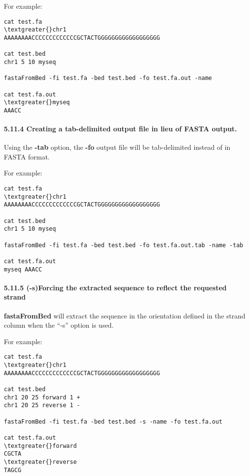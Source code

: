 \documentclass[letterpaper,10pt,english]{sphinxmanual}
\begin{document}
For example:

\begin{Verbatim}[commandchars=\\\{\}]
cat test.fa
\textgreater{}chr1
AAAAAAAACCCCCCCCCCCCCGCTACTGGGGGGGGGGGGGGGGGG

cat test.bed
chr1 5 10 myseq

fastaFromBed -fi test.fa -bed test.bed -fo test.fa.out -name

cat test.fa.out
\textgreater{}myseq
AAACC
\end{Verbatim}


\paragraph{5.11.4 Creating a tab-delimited output file in lieu of FASTA output.}
\label{content/fastafromBed:creating-a-tab-delimited-output-file-in-lieu-of-fasta-output}
Using the \textbf{-tab} option, the \textbf{-fo} output file will be tab-delimited instead of in FASTA format.

For example:

\begin{Verbatim}[commandchars=\\\{\}]
cat test.fa
\textgreater{}chr1
AAAAAAAACCCCCCCCCCCCCGCTACTGGGGGGGGGGGGGGGGGG

cat test.bed
chr1 5 10 myseq

fastaFromBed -fi test.fa -bed test.bed -fo test.fa.out.tab -name -tab

cat test.fa.out
myseq AAACC
\end{Verbatim}


\paragraph{5.11.5 (-s)Forcing the extracted sequence to reflect the requested strand}
\label{content/fastafromBed:s-forcing-the-extracted-sequence-to-reflect-the-requested-strand}
\textbf{fastaFromBed} will extract the sequence in the orientation defined in the strand column when the ``-s''
option is used.

For example:

\begin{Verbatim}[commandchars=\\\{\}]
cat test.fa
\textgreater{}chr1
AAAAAAAACCCCCCCCCCCCCGCTACTGGGGGGGGGGGGGGGGGG

cat test.bed
chr1 20 25 forward 1 +
chr1 20 25 reverse 1 -

fastaFromBed -fi test.fa -bed test.bed -s -name -fo test.fa.out

cat test.fa.out
\textgreater{}forward
CGCTA
\textgreater{}reverse
TAGCG
\end{Verbatim}
\end{document}

